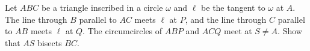 Let $ABC$ be a triangle inscribed in a circle $\omega$ and $\ell$ be the tangent to $\omega$ at $A$. The line through $B$ parallel to $AC$ meets $\ell$ at $P$,  and the line through $C$ parallel to $AB$ meets $\ell$ at $Q$. The circumcircles of $ABP$ and $ACQ$ meet at $S\neq A$. Show that $AS$ bisects $BC$.